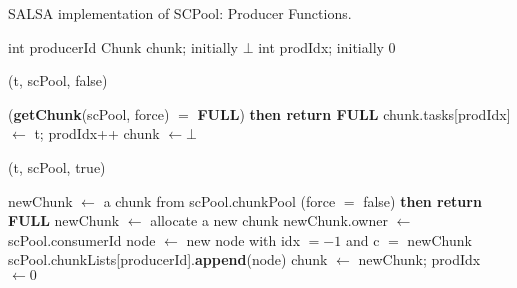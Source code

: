 \begin{algo}[!ht]
\caption{SALSA implementation of SCPool: Producer Functions.}
\label{alg:producer-non-fifo}
\scriptsize
\begin{minipage}[t]{0.48\textwidth}
\begin{distribalgo}[1]
\setcounter{ALC@line}{\value{alg:non-fifo:lines}}

	\STATE int producerId
	\STATE Chunk chunk; initially $\bot$  \label{alg:line:chunk}
	\STATE int prodIdx; initially $0$ 
\ENDINDENT

\medskip

	(t, scPool, false)
\ENDINDENT

\medskip

		 ({\bf getChunk}(scPool, force) $=$ {\bf FULL}) {\bf then return FULL}
	\ENDINDENT
	\STATE chunk.tasks[prodIdx] $\leftarrow$ t; prodIdx++ \label{alg:line:chunk-insert}
	  \STATE chunk $\leftarrow \bot$ 
	\ENDINDENT
\ENDINDENT

\setcounter{alg:non-fifo:lines}{\value{ALC@line}} %
\end{distribalgo}
\end{minipage}%
%
\hfill
%
\begin{minipage}[t]{0.48\textwidth}
%
\begin{distribalgo}[1]
\setcounter{ALC@line}{\value{alg:non-fifo:lines}}

	(t, scPool, true)
\ENDINDENT

\medskip

	\STATE newChunk $\leftarrow$ a chunk from scPool.chunkPool
	 \label{alg:line:no-chunk-start}
		 (force $=$ false) {\bf then return FULL} 
		 \STATE newChunk $\leftarrow$ allocate a new chunk \label{alg:line:no-chunk-end}
	\ENDINDENT
	\STATE newChunk.owner $\leftarrow$ scPool.consumerId
	\STATE node $\leftarrow$ new node with idx $=-1$ and c $=$ newChunk
	\STATE scPool.chunkLists[producerId].{\bf append}(node)
	\STATE chunk $\leftarrow$ newChunk; prodIdx $\leftarrow 0$ 
\ENDINDENT

\setcounter{alg:non-fifo:lines}{\value{ALC@line}}
\end{distribalgo}
\end{minipage}
\end{algo}
